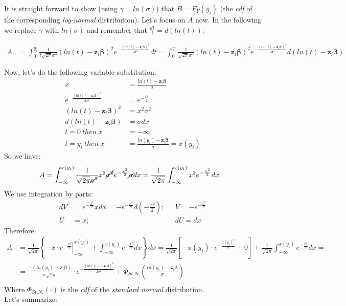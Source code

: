 \documentclass[]{article}
\begin{document}
It is straight forward to show (using $\gamma = ln(\sigma)$) that $B = F_Y(y_i)$ (the \emph{cdf} of the corresponding \emph{log-normal} distribution). Let's focus on $A$ now. In the following we replace $\gamma$ with $ln(\sigma)$ and remember that $\frac{dt}{t} = d\left(ln(t)\right)$:

  $$
  \begin{aligned}
    A &=   \int_0^{y_i}   \frac{1}{t \sqrt{2 \pi } \sigma^3}  \left(  ln(t) -  \pmb{z}_i\pmb{\beta}  \right)^2 e^{-\frac{(ln(t) - \pmb{z}_i\pmb{\beta})^2}{2\sigma^2}} dt  = 
    \int_0^{y_i}   \frac{1}{\sqrt{2 \pi } \sigma^3}  \left(  ln(t) -  \pmb{z}_i\pmb{\beta}  \right)^2 e^{-\frac{(ln(t) - \pmb{z}_i\pmb{\beta})^2}{2\sigma^2}} d(ln(t) - \pmb{z}_i\pmb{\beta})
  \end{aligned}
  $$

Now, let's do the following variable substitution:
  $$
  \begin{aligned}
    x &=  \frac{ln(t) - \pmb{z}_i\pmb{\beta}}{\sigma}\\
    e^{-\frac{(ln(t) - \pmb{z}_i\pmb{\beta})^2}{2\sigma^2}}   &=   e^{-\frac{x^2}{2}}\\
    \left(  ln(t) -  \pmb{z}_i\pmb{\beta}  \right)^2   &=  x^2 \sigma^2\\
    d(ln(t) - \pmb{z}_i\pmb{\beta}) &= \sigma dx\\
    t=0~then~x &= -\infty\\
    t = y_i ~then~x  &=\frac{ln(y_i) - \pmb{z}_i\pmb{\beta}}{\sigma} = x(y_i)
  \end{aligned}
  $$
So we have:
  $$
  \begin{aligned}
    A &=   \int_{-\infty}^{x(y_i)}   \frac{1}{ \sqrt{2 \pi } \cancel{\sigma^3}}   x^2 \cancel{\sigma^2} e^{-\frac{x^2}{2}} \cancel{\sigma} dx  =  \frac{1}{ \sqrt{2 \pi } }  \int_{-\infty}^{x(y_i)}     x^2  e^{-\frac{x^2}{2}} dx
  \end{aligned}
  $$
We use integration by parts:
  $$
  \begin{aligned}
    dV &= e^{-\frac{x^2}{2}} x dx = -e^{-\frac{x^2}{2}} d\left(-\frac{x^2}{2}\right);~~~ &V = - e^{-\frac{x^2}{2}}\\
    U &= x;~~~ &dU = dx
  \end{aligned}
  $$
Therefore:
  $$
  \begin{aligned}
    A & =  \frac{1}{ \sqrt{2 \pi } }      \left\{    \left.-x\cdot e^{-\frac{x^2}{2}}\right|_{-\infty}^{x(y_i)}  + \int_{-\infty}^{x(y_i)} e^{-\frac{x^2}{2}} dx   \right\}      dx =  \frac{1}{ \sqrt{2 \pi } }   \left[-x(y_i)\cdot e^{-\frac{x(y_i)^2}{2}}  + 0  \right]  +  \frac{1}{ \sqrt{2 \pi } }  \int_{-\infty}^{x(y_i)} e^{-\frac{x^2}{2}} dx  =\\
    & =  \frac{-(ln(y_i) - \pmb{z}_i\pmb{\beta})}{ \sigma\sqrt{2 \pi } }  \cdot e^{-\frac{(ln(y_i) - \pmb{z}_i\pmb{\beta})^2}{2\sigma^2}}   +  \Phi_{St.N.}\left(  \frac{ln(y_i) - \pmb{z}_i\pmb{\beta}}{\sigma}  \right)\\
  \end{aligned}
  $$
Where $\Phi_{St.N.}(\cdot)$ is the \emph{cdf} of the \emph{standard normal} distribution.\\
Let's summarize:
\end{document}
